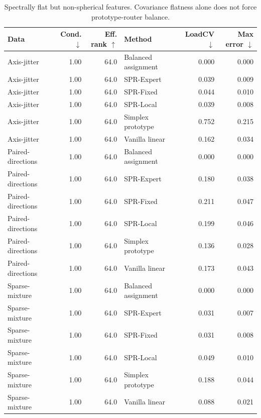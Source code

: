 \begin{table}[t]
\centering
\caption{Spectrally flat but non-spherical features. Covariance flatness alone does not force prototype-router balance.}
\label{tab:e2_non_spherical}
\begin{tabular}{lrrlrr}
\toprule
Data & Cond. $\downarrow$ & Eff. rank $\uparrow$ & Method & LoadCV $\downarrow$ & Max error $\downarrow$ \\
\midrule
Axis-jitter & 1.00 & 64.0 & Balanced assignment & 0.000 & 0.000 \\
Axis-jitter & 1.00 & 64.0 & SPR-Expert & 0.039 & 0.009 \\
Axis-jitter & 1.00 & 64.0 & SPR-Fixed & 0.044 & 0.010 \\
Axis-jitter & 1.00 & 64.0 & SPR-Local & 0.039 & 0.008 \\
Axis-jitter & 1.00 & 64.0 & Simplex prototype & 0.752 & 0.215 \\
Axis-jitter & 1.00 & 64.0 & Vanilla linear & 0.162 & 0.034 \\
Paired-directions & 1.00 & 64.0 & Balanced assignment & 0.000 & 0.000 \\
Paired-directions & 1.00 & 64.0 & SPR-Expert & 0.180 & 0.038 \\
Paired-directions & 1.00 & 64.0 & SPR-Fixed & 0.211 & 0.047 \\
Paired-directions & 1.00 & 64.0 & SPR-Local & 0.199 & 0.046 \\
Paired-directions & 1.00 & 64.0 & Simplex prototype & 0.136 & 0.028 \\
Paired-directions & 1.00 & 64.0 & Vanilla linear & 0.173 & 0.043 \\
Sparse-mixture & 1.00 & 64.0 & Balanced assignment & 0.000 & 0.000 \\
Sparse-mixture & 1.00 & 64.0 & SPR-Expert & 0.031 & 0.007 \\
Sparse-mixture & 1.00 & 64.0 & SPR-Fixed & 0.031 & 0.008 \\
Sparse-mixture & 1.00 & 64.0 & SPR-Local & 0.049 & 0.010 \\
Sparse-mixture & 1.00 & 64.0 & Simplex prototype & 0.188 & 0.044 \\
Sparse-mixture & 1.00 & 64.0 & Vanilla linear & 0.088 & 0.021 \\
\bottomrule
\end{tabular}
\end{table}
